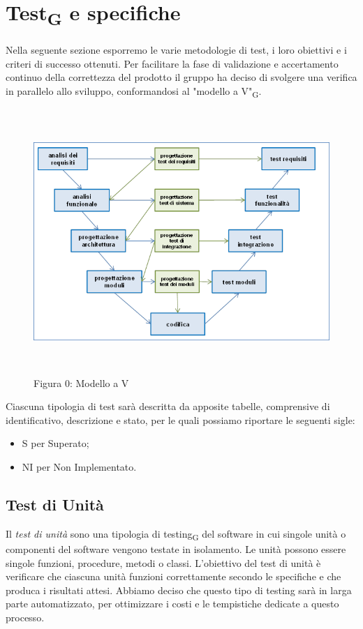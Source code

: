 \documentclass{article}
\begin{document}
\section{Test\textsubscript{G} e specifiche}
Nella seguente sezione esporremo le varie metodologie di test, i loro obiettivi e i criteri di successo ottenuti. Per facilitare la fase di validazione e accertamento continuo della correttezza del prodotto il gruppo ha deciso di svolgere una verifica in parallelo allo sviluppo, conformandosi al "modello a V"\textsubscript{G}.  
\begin{figure}[H]
    \centering
    \includegraphics[width=15cm, height=10cm]{./documenti/grafici/modello_a_v.png}
    \caption{Figura 0: Modello a V}
\end{figure}

Ciascuna tipologia di test sarà descritta da apposite tabelle, comprensive
di identificativo, descrizione e stato, per le quali possiamo riportare le seguenti sigle:
\begin{itemize}
    \item{ S per Superato;}
    
    \item { NI per Non Implementato.}    
\end{itemize}



\subsection{Test di Unità}
Il \textit{test di unità} sono una tipologia di testing\textsubscript{G} del software in cui singole unità o componenti del software vengono testate in isolamento. Le unità possono essere singole funzioni, procedure, metodi o classi. L'obiettivo del test di unità è verificare che ciascuna unità funzioni correttamente secondo le specifiche e che produca i risultati attesi. Abbiamo deciso che questo tipo di testing sarà in larga parte automatizzato, per ottimizzare i costi e le tempistiche dedicate a questo processo.
\end{document}
